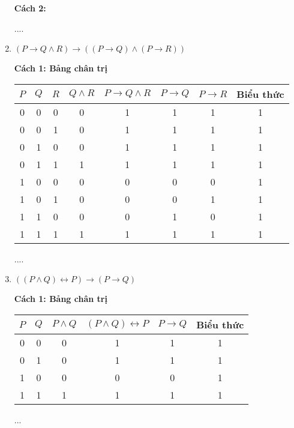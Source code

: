 \documentclass[11pt, oneside,openright,a4paper]{book}
\begin{document}
\begin{enumerate}
    \textbf{Cách 2:}

   ....
    \bigskip

    \item $(P \rightarrow Q \land R) \rightarrow ((P \rightarrow Q) \land (P \rightarrow R))$

    \textbf{Cách 1: Bảng chân trị}

    \begin{center}
    \begin{tabular}{|c|c|c|c|c|c|c|c|}
        \hline
        $P$ & $Q$ & $R$ & $Q \land R$ & $P \rightarrow Q \land R$ & $P \rightarrow Q$ & $P \rightarrow R$ & Biểu thức \\
        \hline
        0 & 0 & 0 & 0 & 1 & 1 & 1 & 1 \\
        0 & 0 & 1 & 0 & 1 & 1 & 1 & 1 \\
        0 & 1 & 0 & 0 & 1 & 1 & 1 & 1 \\
        0 & 1 & 1 & 1 & 1 & 1 & 1 & 1 \\
        1 & 0 & 0 & 0 & 0 & 0 & 0 & 1 \\
        1 & 0 & 1 & 0 & 0 & 0 & 1 & 1 \\
        1 & 1 & 0 & 0 & 0 & 1 & 0 & 1 \\
        1 & 1 & 1 & 1 & 1 & 1 & 1 & 1 \\
        \hline
    \end{tabular}
    \end{center}

....
    \bigskip

    \item $((P \land Q) \leftrightarrow P) \rightarrow (P \rightarrow Q)$

    \textbf{Cách 1: Bảng chân trị}

    \begin{center}
    \begin{tabular}{|c|c|c|c|c|c|}
        \hline
        $P$ & $Q$ & $P \land Q$ & $(P \land Q) \leftrightarrow P$ & $P \rightarrow Q$ & Biểu thức \\
        \hline
        0 & 0 & 0 & 1 & 1 & 1 \\
        0 & 1 & 0 & 1 & 1 & 1 \\
        1 & 0 & 0 & 0 & 0 & 1 \\
        1 & 1 & 1 & 1 & 1 & 1 \\
        \hline
    \end{tabular}
    \end{center}
...

\end{enumerate}
\end{document}
